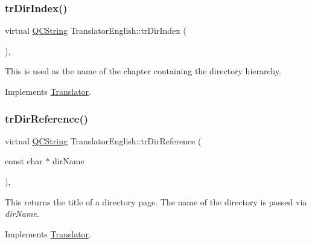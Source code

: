 \mbox{\label{class_translator_english_a0b269f19748a771c73ddbc611d879bed}} 
\subsubsection{\texorpdfstring{trDirIndex()}{trDirIndex()}}
{\footnotesize\ttfamily virtual \mbox{\hyperlink{class_q_c_string}{Q\+C\+String}} Translator\+English\+::tr\+Dir\+Index (\begin{DoxyParamCaption}{ }\end{DoxyParamCaption})\hspace{0.3cm}{\ttfamily [inline]}, {\ttfamily [virtual]}}

This is used as the name of the chapter containing the directory hierarchy. 

Implements \mbox{\hyperlink{class_translator}{Translator}}.

\mbox{\label{class_translator_english_acee75319babb77d3d03b57e5fffb886e}} 
\subsubsection{\texorpdfstring{trDirReference()}{trDirReference()}}
{\footnotesize\ttfamily virtual \mbox{\hyperlink{class_q_c_string}{Q\+C\+String}} Translator\+English\+::tr\+Dir\+Reference (\begin{DoxyParamCaption}\item[{const char $\ast$}]{dir\+Name }\end{DoxyParamCaption})\hspace{0.3cm}{\ttfamily [inline]}, {\ttfamily [virtual]}}

This returns the title of a directory page. The name of the directory is passed via {\itshape dir\+Name}. 

Implements \mbox{\hyperlink{class_translator}{Translator}}.

\mbox{\label{class_translator_english_a8230892d40d8c6a1aab821817487f046}} 
